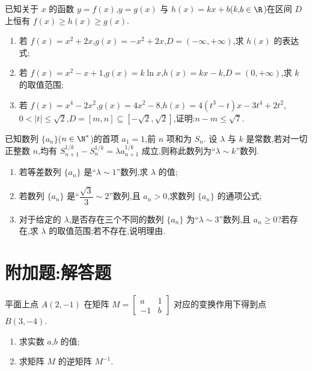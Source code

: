 \begin{problem}
已知关于 \(x\) 的函数 \(y=f(x)\),\(y=g(x)\) 与 \(h(x)=kx+b\)(\(k\),\(b\in\R\))在区间 \(D\) 上恒有 \(f(x)\ge h(x)\ge g(x)\).

\begin{enumerate}
\item 若 \(f(x)=x^2+2x\),\(g(x)=-x^2+2x\),\(D=(-\infty,+\infty)\),求 \(h(x)\) 的表达式;
\item 若 \(f(x)=x^2-x+1\),\(g(x)=k\ln x\),\(h(x)=kx-k\),\(D=(0,+\infty)\),求 \(k\) 的取值范围;
\item 若 \(f(x)=x^4-2x^2\),\(g(x)=4x^2-8\),\(h(x)=4(t^3-t)x-3t^4+2t^2\),\(0<|t|\le\sqrt2\),\(D=[m,n]\subseteq[-\sqrt2,\sqrt2]\),证明:\(n-m\le\sqrt7\).
\end{enumerate}
\end{problem}

\begin{problem}
已知数列 \(\{a_n\}\)(\(n\in\N^*\))的首项 \(a_1=1\),前 \(n\) 项和为 \(S_n\). 设 \(\lambda\) 与 \(k\) 是常数,若对一切正整数 \(n\),均有 \(S_{n+1}^{1/k}-S_n^{1/k}=\lambda a_{n+1}^{1/k}\) 成立,则称此数列为``\(\lambda\sim k\)''数列.

\begin{enumerate}
\item 若等差数列 \(\{a_n\}\) 是``\(\lambda\sim1\)''数列,求 \(\lambda\) 的值;
\item 若数列 \(\{a_n\}\) 是``\(\dfrac{\sqrt3}{3}\sim2\)''数列,且 \(a_n>0\),求数列 \(\{a_n\}\) 的通项公式;
\item 对于给定的 \(\lambda\),是否存在三个不同的数列 \(\{a_n\}\) 为``\(\lambda\sim3\)''数列,且 \(a_n\ge0\)?若存在,求 \(\lambda\) 的取值范围;若不存在,说明理由.
\end{enumerate}
\end{problem}

\section{附加题:解答题}

\begin{problem}[A]
平面上点 \(A(2,-1)\) 在矩阵 \(M=\begin{bmatrix}a&1\\-1&b\end{bmatrix}\) 对应的变换作用下得到点 \(B(3,-4)\).

\begin{enumerate}
\item 求实数 \(a\),\(b\) 的值;
\item 求矩阵 \(M\) 的逆矩阵 \(M^{-1}\).
\end{enumerate}
\end{problem}

